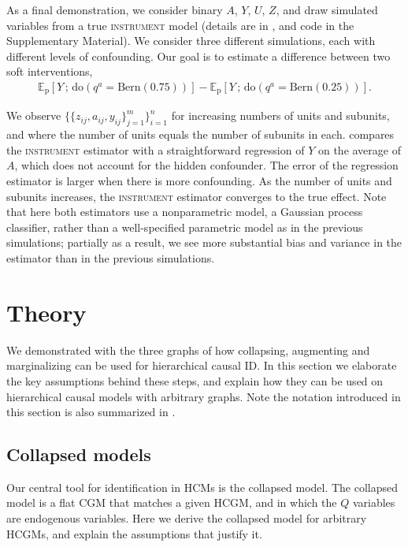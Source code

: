 \documentclass[12pt]{article}
\newcommand{\EE}[2]{\mathbb{E}_{#1}\left[ #2 \right]}
\newcommand{\rmdo}{\mathrm{do}}
\newcommand{\s}{\, ; \,}
\newcommand{\pr}{\mathrm{p}}
\begin{document}
As a final demonstration, we consider binary $A$, $Y$, $U$, $Z$, and
draw simulated variables from a true \textsc{instrument} model (details are in , and code in the Supplementary Material). We
consider three different simulations, each with different levels of
confounding.  Our goal is to
estimate a difference between two soft interventions,
\begin{align}
  \EE{\pr}
  {Y
  \s \rmdo(q^a = \textrm{Bern}(0.75))} -
  \EE{\pr}
  {Y
  \s \rmdo(q^a = \textrm{Bern}(0.25))}.
\end{align}

We observe $\{\{z_{ij}, a_{ij}, y_{ij}\}_{j=1}^m\}_{i=1}^n$
for increasing numbers of units and subunits, and where the number of
units equals the number of subunits in each. 
compares the \textsc{instrument} estimator with a straightforward regression of
$Y$ on the average of $A$, which does not account for the hidden
confounder.  The error of the regression estimator is larger when
there is more confounding. As the number of units and subunits
increases, the \textsc{instrument} estimator converges to the true effect.
Note that here both estimators use a nonparametric model, a Gaussian process classifier, rather than a well-specified parametric model as in the previous simulations; partially as a result, we see more substantial bias and variance in the estimator than in the previous simulations.







 \section{Theory} \label{sec:theory}

We demonstrated with the three graphs of  how collapsing, augmenting and marginalizing can be used for hierarchical causal ID. 
In this section we elaborate the key assumptions behind these steps, and explain how they can be used on hierarchical causal models with arbitrary graphs.
Note the notation introduced in this section is also summarized in .

\subsection{Collapsed models} \label{sec:collapse_theory}

Our central tool for identification in HCMs is the collapsed model.
The collapsed model is a flat CGM that matches a given HCGM, and
in which the $Q$ variables are endogenous variables. Here we derive
the collapsed model for arbitrary HCGMs, and explain the assumptions that justify it.
\end{document}
